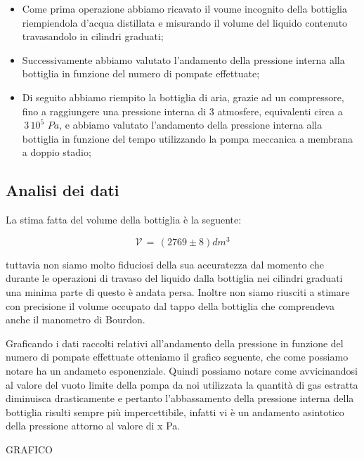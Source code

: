 \begin{itemize}
	\item{Come prima operazione abbiamo ricavato il voume incognito della bottiglia riempiendola d'acqua distillata e misurando il volume del liquido contenuto travasandolo in cilindri graduati;}
	\item{Successivamente abbiamo valutato l'andamento della pressione interna alla bottiglia in funzione del numero di pompate effettuate;}
	\item{Di seguito abbiamo riempito la bottiglia di aria, grazie ad un compressore, fino a raggiungere una pressione interna di 3 atmosfere, equivalenti circa a $\,3\,10^5\,\,Pa$, e abbiamo valutato l'andamento della pressione interna alla bottiglia in funzione del tempo utilizzando la pompa meccanica a membrana a doppio stadio;}
\end{itemize}

\subsection{Analisi dei dati}

La stima fatta del volume della bottiglia è la seguente:

\begin{equation}
	\mathcal{V} \, = \, (2769 \pm 8) dm^3  
\end{equation}

tuttavia non siamo molto fiduciosi della sua accuratezza dal momento che durante le operazioni di travaso del liquido dalla bottiglia nei cilindri graduati una minima parte di questo è andata persa. Inoltre non siamo riusciti a stimare con precisione il volume occupato dal tappo della bottiglia che comprendeva anche il manometro di Bourdon.

Graficando i dati raccolti relativi all'andamento della pressione in funzione del numero di pompate effettuate otteniamo il grafico seguente, che come possiamo notare ha un andameto esponenziale. Quindi possiamo notare come avvicinandosi al valore del vuoto limite della pompa da noi utilizzata la quantità di gas estratta diminuisca drasticamente e pertanto l'abbassamento della pressione interna della bottiglia risulti sempre più impercettibile, infatti vi è un andamento asintotico della pressione attorno al valore di x Pa.

GRAFICO


